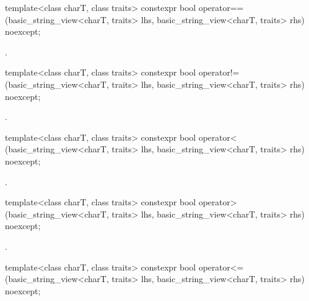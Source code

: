 %
\begin{itemdecl}
template<class charT, class traits>
  constexpr bool operator==(basic_string_view<charT, traits> lhs,
                            basic_string_view<charT, traits> rhs) noexcept;
\end{itemdecl}

\begin{itemdescr}
\pnum
\returns
{}.
\end{itemdescr}

%
\begin{itemdecl}
template<class charT, class traits>
  constexpr bool operator!=(basic_string_view<charT, traits> lhs,
                            basic_string_view<charT, traits> rhs) noexcept;
\end{itemdecl}

\begin{itemdescr}
\pnum
\returns
{}.
\end{itemdescr}

%
\begin{itemdecl}
template<class charT, class traits>
  constexpr bool operator< (basic_string_view<charT, traits> lhs,
                            basic_string_view<charT, traits> rhs) noexcept;
\end{itemdecl}

\begin{itemdescr}
\pnum
\returns
{}.
\end{itemdescr}

%
\begin{itemdecl}
template<class charT, class traits>
  constexpr bool operator> (basic_string_view<charT, traits> lhs,
                            basic_string_view<charT, traits> rhs) noexcept;
\end{itemdecl}

\begin{itemdescr}
\pnum
\returns
{}.
\end{itemdescr}

%
\begin{itemdecl}
template<class charT, class traits>
  constexpr bool operator<=(basic_string_view<charT, traits> lhs,
                            basic_string_view<charT, traits> rhs) noexcept;
\end{itemdecl}

